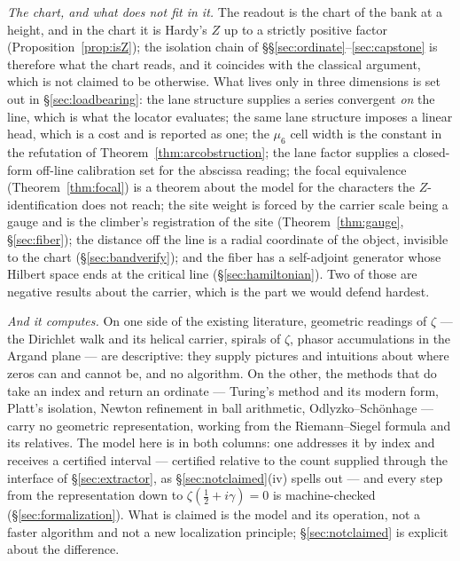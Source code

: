 \documentclass[11pt]{article}
\theoremstyle{plain}
\theoremstyle{definition}
\theoremstyle{remark}
\begin{document}
\emph{The chart, and what does not fit in it.} The readout is the chart of the bank at a
height, and in the chart it is Hardy's $Z$ up to a strictly positive factor
(Proposition~\ref{prop:isZ}); the isolation chain of
\S\S\ref{sec:ordinate}--\ref{sec:capstone} is therefore what the chart reads, and it
coincides with the classical argument, which is not claimed to be otherwise. What lives
only in three dimensions is set out in \S\ref{sec:loadbearing}: the lane structure
supplies a series convergent \emph{on} the line, which is what the locator evaluates; the
same lane structure imposes a linear head, which is a cost and is reported as one; the
$\mu_6$ cell width is the constant in the refutation of Theorem~\ref{thm:arcobstruction};
the lane factor supplies a closed-form off-line calibration set for the abscissa reading;
the focal equivalence (Theorem~\ref{thm:focal}) is a theorem about the model for the
characters the $Z$-identification does not reach; the site weight is forced by the
carrier scale being a gauge and is the climber's registration of the site
(Theorem~\ref{thm:gauge}, \S\ref{sec:fiber}); the distance off the line is a radial
coordinate of the object, invisible to the chart (\S\ref{sec:bandverify}); and the fiber
has a self-adjoint generator whose Hilbert space ends at the critical line
(\S\ref{sec:hamiltonian}). Two of those are negative results about the carrier, which is
the part we would defend hardest.

\emph{And it computes.} On one side of the existing literature, geometric readings of
$\zeta$ --- the Dirichlet walk and its helical carrier, spirals of $\zeta$, phasor
accumulations in the Argand plane --- are descriptive: they supply pictures and
intuitions about where zeros can and cannot be, and no algorithm. On the other, the
methods that do take an index and return an ordinate --- Turing's method and its
modern form, Platt's isolation, Newton refinement in ball arithmetic,
Odlyzko--Sch\"onhage --- carry no geometric representation, working from the
Riemann--Siegel formula and its relatives. The model here is in both columns: one
addresses it by index and receives a certified interval --- certified relative to the
count supplied through the interface of \S\ref{sec:extractor}, as
\S\ref{sec:notclaimed}(iv) spells out --- and every step from the
representation down to $\zeta(\tfrac12+i\gamma)=0$ is machine-checked
(\S\ref{sec:formalization}). What is claimed is the model and its operation, not a
faster algorithm and not a new localization principle; \S\ref{sec:notclaimed} is
explicit about the difference.
\end{document}
